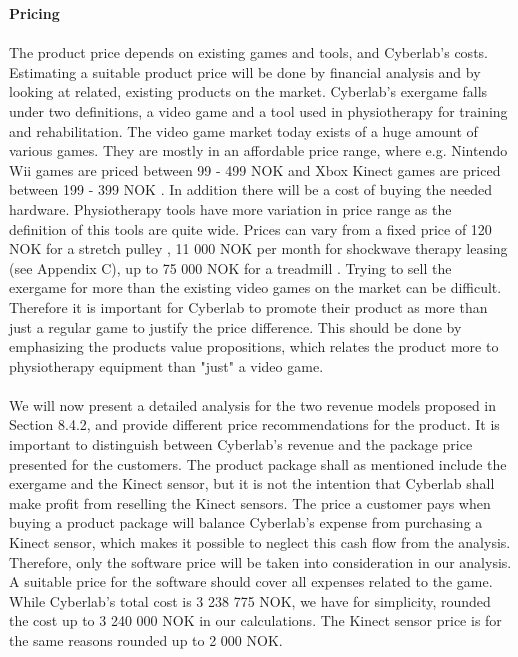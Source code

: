 \textbf{Pricing}\\ \\
The product price depends on existing games and tools, and Cyberlab's costs. Estimating a suitable product price will be done by financial analysis and by looking at related, existing products on the market. Cyberlab's exergame falls under two definitions, a video game and a tool used in physiotherapy for training and rehabilitation. The video game market today exists of a huge amount of various games. They are mostly in an affordable price range, where e.g. Nintendo Wii games are priced between 99 - 499 NOK \cite{elkjopwii} and Xbox Kinect games are priced between 199 - 399 NOK \cite{elkjopkinect}. In addition there will be a cost of buying the needed hardware. Physiotherapy tools have more variation in price range as the definition of this tools are quite wide. Prices can vary from a fixed price of 120 NOK for a stretch pulley \cite{stretchpulley}, 11 000 NOK per month for shockwave therapy leasing (see Appendix C), up to 75 000 NOK for a treadmill \cite{treadmill}. Trying to sell the exergame for more than the existing video games on the market can be difficult. Therefore it is important for Cyberlab to promote their product as more than just a regular game to justify the price difference. This should be done by emphasizing the products value propositions, which relates the product more to physiotherapy equipment than "just" a video game. \\ \\
We will now present a detailed analysis for the two revenue models proposed in Section 8.4.2, and provide different price recommendations for the product. It is important to distinguish between Cyberlab's revenue and the package price presented for the customers. The product package shall as mentioned include the exergame and the Kinect sensor, but it is not the intention that Cyberlab shall make profit from reselling the Kinect sensors. The price a customer pays when buying a product package will balance Cyberlab's expense from purchasing a Kinect sensor, which makes it possible to neglect this cash flow from the analysis. Therefore, only the software price will be taken into consideration in our analysis. A suitable price for the software should cover all expenses related to the game. While Cyberlab's total cost is 3 238 775 NOK, we have for simplicity,  rounded the cost up to 3 240 000 NOK in our calculations. The Kinect sensor price is for the same reasons rounded up to 2 000 NOK. \\ \\ 
